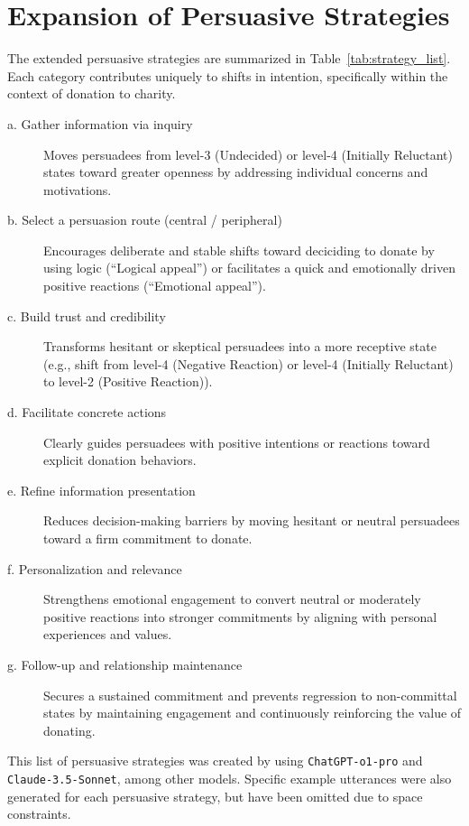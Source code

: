 \documentclass[11pt]{article}
\begin{document}
\section{Expansion of Persuasive Strategies}
\label{sec:strategy_list}
The extended persuasive strategies are summarized in Table~\ref{tab:strategy_list}.
Each category contributes uniquely to shifts in intention, specifically within the context of donation to charity.
% 
\begin{description}
    \item[a. Gather information via inquiry] Moves persuadees from level-3 (Undecided) or level-4 (Initially Reluctant) states toward greater openness by addressing individual concerns and motivations.
    
    \item[b. Select a persuasion route (central / peripheral)] Encourages deliberate and stable shifts toward deciciding to donate by using logic (``Logical appeal'') or facilitates a quick and emotionally driven positive reactions (``Emotional appeal'').
    
    \item[c. Build trust and credibility] Transforms hesitant or skeptical persuadees into a more receptive state (e.g., shift from level-4 (Negative Reaction) or level-4 (Initially Reluctant) to level-2 (Positive Reaction)).
    
    \item[d. Facilitate concrete actions] Clearly guides persuadees with positive intentions or reactions toward explicit donation behaviors.
    
    \item[e. Refine information presentation] Reduces decision-making barriers by moving hesitant or neutral persuadees toward a firm commitment to donate.
    
    \item[f. Personalization and relevance] Strengthens emotional engagement to convert neutral or moderately positive reactions into stronger commitments by aligning with personal experiences and values.
    
    \item[g. Follow-up and relationship maintenance] Secures a sustained commitment and prevents regression to non-committal states by maintaining engagement and continuously reinforcing the value of donating.
\end{description}

This list of persuasive strategies was created by using \texttt{ChatGPT-o1-pro} and \texttt{Claude-3.5-Sonnet}, among other models. Specific example utterances were also generated for each persuasive strategy, but have been omitted due to space constraints.
\end{document}
